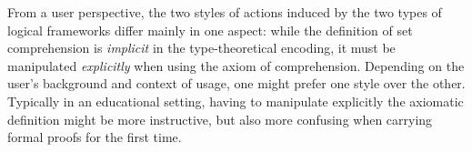 From a user perspective, the two styles of actions induced by the two types of
logical frameworks differ mainly in one aspect: while the definition of set
comprehension is \emph{implicit} in the type-theoretical encoding, it must be
manipulated \emph{explicitly} when using the axiom of comprehension. Depending on the user's background and context
of usage, one might prefer one style over the other. Typically in an educational
setting, having to manipulate explicitly the axiomatic definition might be more
instructive, but also more confusing when carrying formal proofs for the first
time.

